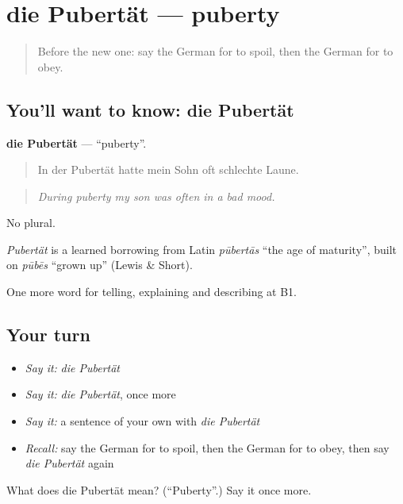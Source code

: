 \section[die Pubertät]{die Pubertät — puberty}

\label{lesson:GE-C495-pubertaet}



\begin{quote}
Before the new one: say the German for to spoil, then the German for to obey.
\end{quote}

\subsection*{You'll want to know: die Pubertät}
\textbf{die Pubertät} — \textquotedblleft{}puberty\textquotedblright{}.

\begin{quote}
In der Pubertät hatte mein Sohn oft schlechte Laune.
\end{quote}

\begin{quote}
\emph{During puberty my son was often in a bad mood.}
\end{quote}

No plural.

\begin{cousinweb}
\emph{Pubertät} is a learned borrowing from Latin \emph{pūbertās} \textquotedblleft{}the age of maturity\textquotedblright{}, built on \emph{pūbēs} \textquotedblleft{}grown up\textquotedblright{} (Lewis \& Short).
\end{cousinweb}

\begin{grammarlens}[title={What you've built}]
One more word for telling, explaining and describing at B1.
\end{grammarlens}

\subsection*{Your turn}
\begin{itemize}
\raggedright
  \item \emph{Say it:} \emph{die Pubertät}
  \item \emph{Say it:} \emph{die Pubertät}, once more
  \item \emph{Say it:} a sentence of your own with \emph{die Pubertät}
  \item \emph{Recall:} say the German for to spoil, then the German for to obey, then say \emph{die Pubertät} again
\end{itemize}

\begin{tcolorbox}[breakable,colback=teal!4,colframe=teal!35!black,title={Before you move on}]
What does die Pubertät mean? (\textquotedblleft{}Puberty\textquotedblright{}.) Say it once more.
\end{tcolorbox}
